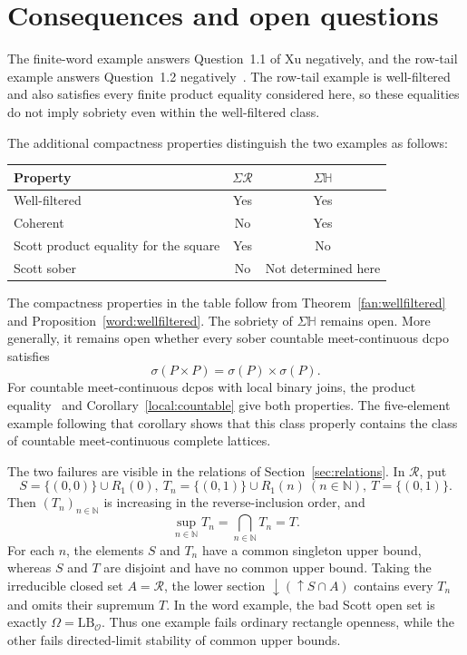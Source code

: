 \documentclass[fleqn,preprint,3p,a4paper]{elsarticle}
\theoremstyle{definition}
\newcommand{\N}{\mathbb N}
\newcommand{\HH}{\mathbb H}
\newcommand{\RR}{\mathcal R}
\begin{document}
\section{Consequences and open questions}\label{sec:boundaries}
The finite-word example answers Question~1.1 of Xu negatively, and the row-tail example answers Question~1.2 negatively~\cite{Xu}. The row-tail example is well-filtered and also satisfies every finite product equality considered here, so these equalities do not imply sobriety even within the well-filtered class.


The additional compactness properties distinguish the two examples as follows:
\begin{center}
\begin{tabular}{@{}lcc@{}}
\toprule
Property & $\Sigma\RR$ & $\Sigma\HH$\\
\midrule
Well-filtered & Yes & Yes\\
Coherent & No & Yes\\
Scott product equality for the square & Yes & No\\
Scott sober & No & Not determined here\\
\bottomrule
\end{tabular}
\end{center}
The compactness properties in the table follow from Theorem~\ref{fan:wellfiltered} and Proposition~\ref{word:wellfiltered}. The sobriety of $\Sigma\HH$ remains open. More generally, it remains open whether every sober countable meet-continuous dcpo satisfies
\[
 \sigma(P\times P)=\sigma(P)\times\sigma(P).
\]
For countable meet-continuous dcpos with local binary joins, the product equality~\cite[Corollary~4.2]{Xu} and Corollary~\ref{local:countable} give both properties. The five-element example following that corollary shows that this class properly contains the class of countable meet-continuous complete lattices.

The two failures are visible in the relations of Section~\ref{sec:relations}. In $\RR$, put
\[
 S=\{(0,0)\}\cup R_1(0),~
 T_n=\{(0,1)\}\cup R_1(n)~(n\in\N),~
 T=\{(0,1)\}.
\]
Then $(T_n)_{n\in\N}$ is increasing in the reverse-inclusion order, and
\[
 \sup_{n\in\N}T_n=\bigcap_{n\in\N}T_n=T.
\]
For each $n$, the elements $S$ and $T_n$ have a common singleton upper bound, whereas $S$ and $T$ are disjoint and have no common upper bound. Taking the irreducible closed set $A=\RR$, the lower section ${\downarrow}({\uparrow} S\cap A)$ contains every $T_n$ and omits their supremum $T$. In the word example, the bad Scott open set is exactly $\Omega=\mathrm{LB}_{\mathcal O}$. Thus one example fails ordinary rectangle openness, while the other fails directed-limit stability of common upper bounds.
\end{document}
